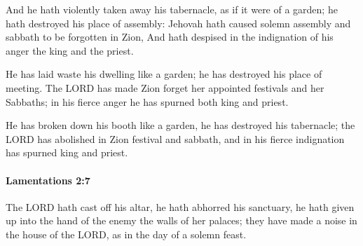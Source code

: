 			\begin{versebox}
					\item[BHS] 
					\item[LXX] 
					\item[ASV] And he hath violently taken away his tabernacle, as if it were of a garden; he hath destroyed his place of assembly: Jehovah hath caused solemn assembly and sabbath to be forgotten in Zion, And hath despised in the indignation of his anger the king and the priest.
					\item[NIV] He has laid waste his dwelling like a garden; he has destroyed his place of meeting. The LORD has made Zion forget her appointed festivals and her Sabbaths; in his fierce anger he has spurned both king and priest.
					\item[NRSV] He has broken down his booth like a garden, he has destroyed his tabernacle; the LORD has abolished in Zion festival and sabbath, and in his fierce indignation has spurned king and priest.
			\end{versebox}

		\paragraph{Lamentations 2:7} %
			\label{LAMENTATIONS-2-7}

			The LORD hath cast off his altar, he hath abhorred his sanctuary, he hath given up into the hand of the enemy the walls of her palaces; they have made a noise in the house of the LORD, as in the day of a solemn feast.

